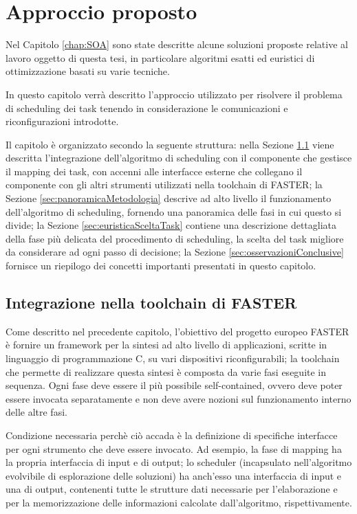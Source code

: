 \chapter{Approccio proposto}
\label{chap:approccio}
\vspace{1cm}
Nel Capitolo \ref{chap:SOA} sono state descritte alcune soluzioni proposte 
relative al lavoro oggetto di questa tesi, in particolare algoritmi esatti ed
euristici di ottimizzazione basati su varie tecniche.

In questo capitolo verrà descritto l'approccio utilizzato per risolvere il 
problema di scheduling dei task tenendo in considerazione le comunicazioni e 
riconfigurazioni introdotte.

Il capitolo è organizzato secondo la seguente struttura: nella Sezione 
\ref{sec:integrazioneToolchainFASTER} viene descritta l'integrazione 
dell'algoritmo di scheduling con il componente che gestisce il mapping dei task, 
con accenni alle interfacce esterne che collegano il componente 
con gli altri strumenti utilizzati nella toolchain di \acs{FASTER}; la Sezione 
\ref{sec:panoramicaMetodologia} descrive ad alto livello il funzionamento 
dell'algoritmo di scheduling, fornendo una panoramica delle fasi in cui questo 
si divide; la Sezione \ref{sec:euristicaSceltaTask} contiene una descrizione 
dettagliata della fase più delicata del procedimento di scheduling, la scelta 
del task migliore da considerare ad ogni passo di decisione; la Sezione 
\ref{sec:osservazioniConclusive} fornisce un riepilogo dei concetti importanti 
presentati in questo capitolo.


\section{Integrazione nella toolchain di \acs{FASTER}}
\label{sec:integrazioneToolchainFASTER}

Come descritto nel precedente capitolo, l'obiettivo del progetto europeo 
\ac{FASTER} è fornire un framework per la sintesi ad alto livello di 
applicazioni, scritte in linguaggio di programmazione C, su vari dispositivi 
riconfigurabili; la toolchain che permette di realizzare questa sintesi è 
composta da varie fasi eseguite in sequenza. Ogni fase deve essere il più 
possibile self-contained, ovvero deve poter essere invocata separatamente e non 
deve avere nozioni sul funzionamento interno delle altre fasi.

Condizione necessaria perchè ciò accada è la definizione di specifiche 
interfacce per ogni strumento che deve essere invocato. Ad esempio, la fase di 
mapping ha la propria interfaccia di input e di output; lo scheduler 
(incapsulato nell'algoritmo evolvibile di esplorazione delle soluzioni) ha 
anch'esso una interfaccia di input e una di output, contenenti tutte 
le strutture dati necessarie per l'elaborazione e per la memorizzazione delle 
informazioni calcolate dall'algoritmo, rispettivamente. 

